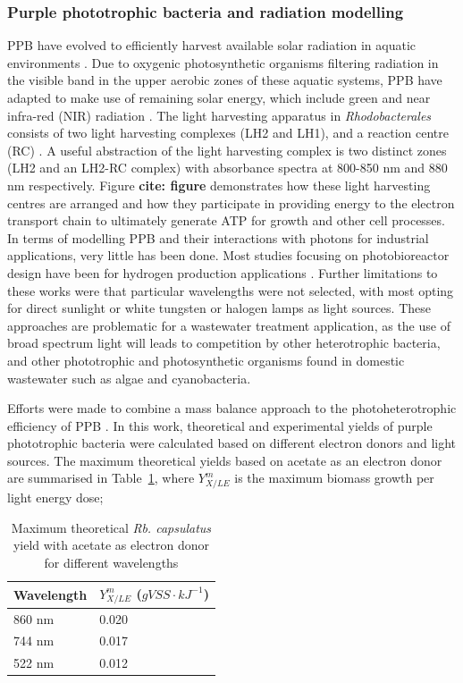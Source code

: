 \subsubsection{Purple phototrophic bacteria and radiation modelling}
PPB have evolved to efficiently harvest available solar radiation in aquatic environments \cite{cogdell2006}. Due to oxygenic photosynthetic organisms filtering radiation in the visible band in the upper aerobic zones of these aquatic systems, PPB have adapted to make use of remaining solar energy, which include green and near infra-red (NIR) radiation \cite{cogdell2006}. The light harvesting apparatus in \textit{Rhodobacterales} consists of two light harvesting complexes (LH2 and LH1), and a reaction centre (RC) \cite{hellingwerf1994}. A useful abstraction of the light harvesting complex is two distinct zones (LH2 and an LH2-RC complex) with absorbance spectra at 800-850 \si{nm} and 880 \si{nm} respectively. Figure \textbf{cite: figure} demonstrates how these light harvesting centres are arranged and how they participate in providing energy to the electron transport chain to ultimately generate ATP for growth and other cell processes.
\skippingparagraph
In terms of modelling PPB and their interactions with photons for industrial applications, very little has been done. Most studies focusing on photobioreactor design have been for hydrogen production applications \cite{adessi2014, krujatz2015}. Further limitations to these works were that particular wavelengths were not selected, with most opting for direct sunlight or white tungsten or halogen lamps as light sources. These approaches are problematic for a wastewater treatment application, as the use of broad spectrum light will leads to competition by other heterotrophic bacteria, and other phototrophic and photosynthetic organisms found in domestic wastewater such as algae and cyanobacteria.
\skippingparagraph

Efforts were made to combine a mass balance approach to the photoheterotrophic efficiency of PPB \cite{minkevich2004}. In this work, theoretical and experimental yields of purple phototrophic bacteria were calculated based on different electron donors and light sources. The maximum theoretical yields based on acetate as an electron donor are summarised in Table~\ref{tab:theoreticalQuantum}, where $Y^m_{X/LE}$ is the maximum biomass growth per light energy dose;

\begin{table}[H]
  \begin{center}
    \caption{Maximum theoretical \textit{Rb. capsulatus} yield with
      acetate as electron donor for different wavelengths
      \cite{minkevich2004}}
    \label{tab:theoreticalQuantum}
    \begin{tabular}{ | l | l |}
      \hline
      Wavelength& $Y^m_{X/LE}$ ($gVSS\cdot kJ^{-1}$)\\ \hline \hline
      860 nm & 0.020 \\ \hline
      744 nm & 0.017  \\ \hline
      522 nm & 0.012  \\ \hline
    \end{tabular}
  \end{center}
\end{table}

